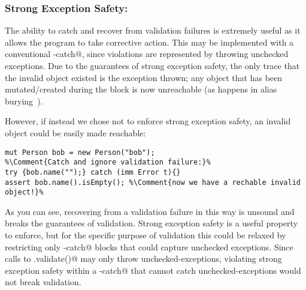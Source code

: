 %
%

\subsubsection*{Strong Exception Safety:}
The ability to catch and recover from validation failures is extremely useful as it allows the program to take corrective action.
This may be implemented with a conventional \Q@try-catch@, since violations are represented by throwing unchecked exceptions. Due to the guarantees of strong exception safety, the only trace that the invalid object existed is the exception thrown; any object that has been mutated/created during the \Q@try@ block is now unreachable (as happens in alias burying~\cite{boyland2001alias}).

However, if instead we chose not to enforce strong exception safety, an invalid object could be easily made reachable:
\saveSpace
\begin{lstlisting}[escapechar=\%]
mut Person bob = new Person("bob");
%\Comment{Catch and ignore validation failure:}%
try {bob.name("");} catch (imm Error t){}
assert bob.name().isEmpty(); %\Comment{now we have a rechable invalid object!}%
\end{lstlisting}
\saveSpace
As you can see, recovering from a validation failure in this way is unsound and breaks the guarantees of validation.
Strong exception safety is a useful property to enforce, but for the specific purpose of validation this could be relaxed by restricting only \Q@try-catch@ blocks that could capture unchecked exceptions.
Since calls to \Q@.validate()@ may only throw unchecked-exceptions, violating strong exception safety within a \Q@try-catch@ that cannot catch unchecked-exceptions would not break validation.




